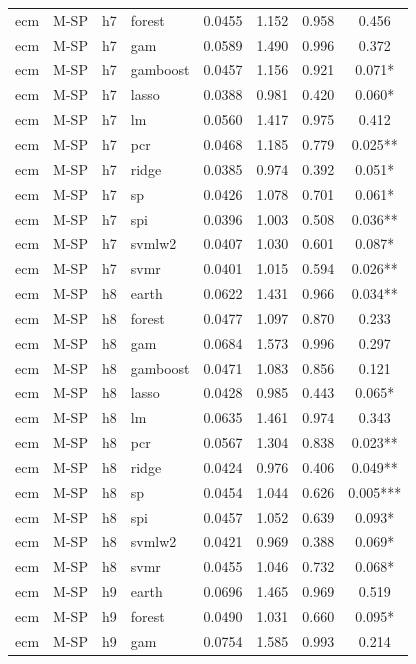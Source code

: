 \begin{ThreePartTable}
\begin{longtable}[t]{llclcccc}
ecm & M-SP & h7 & forest & 0.0455 & 1.152 & 0.958 & 0.456\\
ecm & M-SP & h7 & gam & 0.0589 & 1.490 & 0.996 & 0.372\\
ecm & M-SP & h7 & gamboost & 0.0457 & 1.156 & 0.921 & 0.071*\\
ecm & M-SP & h7 & lasso & 0.0388 & 0.981 & 0.420 & 0.060*\\
ecm & M-SP & h7 & lm & 0.0560 & 1.417 & 0.975 & 0.412\\
ecm & M-SP & h7 & pcr & 0.0468 & 1.185 & 0.779 & 0.025**\\
ecm & M-SP & h7 & ridge & 0.0385 & 0.974 & 0.392 & 0.051*\\
ecm & M-SP & h7 & sp & 0.0426 & 1.078 & 0.701 & 0.061*\\
ecm & M-SP & h7 & spi & 0.0396 & 1.003 & 0.508 & 0.036**\\
ecm & M-SP & h7 & svmlw2 & 0.0407 & 1.030 & 0.601 & 0.087*\\
ecm & M-SP & h7 & svmr & 0.0401 & 1.015 & 0.594 & 0.026**\\
\addlinespace
ecm & M-SP & h8 & earth & 0.0622 & 1.431 & 0.966 & 0.034**\\
ecm & M-SP & h8 & forest & 0.0477 & 1.097 & 0.870 & 0.233\\
ecm & M-SP & h8 & gam & 0.0684 & 1.573 & 0.996 & 0.297\\
ecm & M-SP & h8 & gamboost & 0.0471 & 1.083 & 0.856 & 0.121\\
ecm & M-SP & h8 & lasso & 0.0428 & 0.985 & 0.443 & 0.065*\\
ecm & M-SP & h8 & lm & 0.0635 & 1.461 & 0.974 & 0.343\\
ecm & M-SP & h8 & pcr & 0.0567 & 1.304 & 0.838 & 0.023**\\
ecm & M-SP & h8 & ridge & 0.0424 & 0.976 & 0.406 & 0.049**\\
ecm & M-SP & h8 & sp & 0.0454 & 1.044 & 0.626 & 0.005***\\
ecm & M-SP & h8 & spi & 0.0457 & 1.052 & 0.639 & 0.093*\\
ecm & M-SP & h8 & svmlw2 & 0.0421 & 0.969 & 0.388 & 0.069*\\
ecm & M-SP & h8 & svmr & 0.0455 & 1.046 & 0.732 & 0.068*\\
\addlinespace
ecm & M-SP & h9 & earth & 0.0696 & 1.465 & 0.969 & 0.519\\
ecm & M-SP & h9 & forest & 0.0490 & 1.031 & 0.660 & 0.095*\\
ecm & M-SP & h9 & gam & 0.0754 & 1.585 & 0.993 & 0.214\\

\end{longtable}
\end{ThreePartTable}
